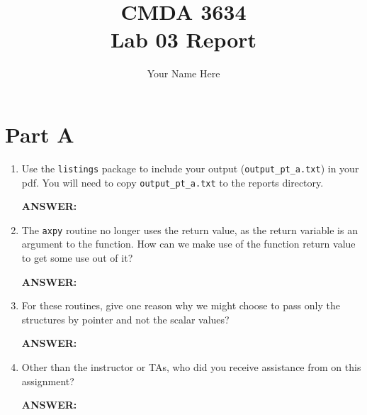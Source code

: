 \documentclass[letter]{article}
\title{CMDA 3634 \\ Lab 03 Report}
\author{Your Name Here}
\begin{document}
\maketitle

\section*{Part A}

\begin{enumerate}
    \item Use the \texttt{listings} package to include your output (\texttt{output\_pt\_a.txt}) in your pdf.  You will need to copy \texttt{output\_pt\_a.txt} to the reports directory.
    
    \textbf{ANSWER:} %


    \item The \texttt{axpy} routine no longer uses the return value, as the return variable is an argument to the function.  How can we make use of the function return value to get some use out of it?

    \textbf{ANSWER:} %

    \item For these routines, give one reason why we might choose to pass only the structures by pointer and not the scalar values?
    
    \textbf{ANSWER:} %

    \item Other than the instructor or TAs, who did you receive assistance from on this assignment?
    
    \textbf{ANSWER:} %
\end{enumerate}




% 
% 
\end{document}
